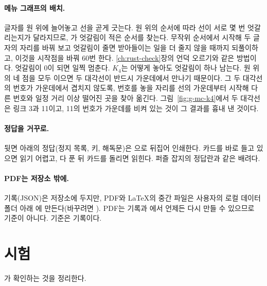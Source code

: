 \paragraph{메뉴 그래프의 배치.} 글자를 원 위에 늘어놓고 선을 곧게 긋는다. 원 위의 순서에 따라 선이 서로 몇 번
엇갈리는지가 달라지므로, 가 엇갈림이 적은 순서를 찾는다. 무작위 순서에서 시작해 두 글자의 자리를
바꿔 보고 엇갈림이 줄면 받아들이는 일을 더 줄지 않을 때까지 되풀이하고, 이것을 시작점을 바꿔 60번 한다.
\ref{ch:rust-check}장의 언덕 오르기와 같은 방법이다. 엇갈림이 0이 되면 일찍 멈춘다. $K_4$는 어떻게 놓아도 엇갈림이
하나 남는다. 원 위의 네 점을 모두 이으면 두 대각선이 반드시 가운데에서 만나기 때문이다. 그 두 대각선의 번호가 가운데에서
겹치지 않도록, 번호를 놓을 자리를 선의 가운데부터 시작해 다른 번호와 일정 거리 이상 떨어진 곳을 찾아 옮긴다.
그림~\ref{fig:g-mc-k4}에서 두 대각선은 링크 3과 11이고, 11의 번호가 가운데를 비켜 있는 것이 그 결과를 흉내 낸
것이다.

\paragraph{정답을 거꾸로.} 뒷면 아래의 정답(정지 목록, 키, 해독문)은 으로
뒤집어 인쇄한다. 카드를 바로 들고 있으면 읽기 어렵고, 다 푼 뒤 카드를 돌리면 읽힌다. 퍼즐 잡지의 정답란과 같은
배려다.

\paragraph{PDF는 저장소 밖에.} 기록(JSON)은 저장소에 두지만, PDF와 LaTeX의 중간 파일은 사용자의 로컬 데이터 폴더
아래 에 만든다(바꾸려면 ). PDF는 기록과 에서 언제든 다시
만들 수 있으므로 기준이 아니다. 기준은 기록이다.

\section{시험}\label{sec:mc-tests}

가 확인하는 것을 정리한다.

